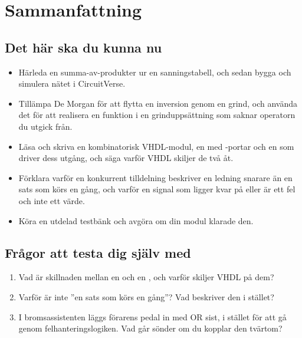 
\section{Sammanfattning}
\label{c1:sec:review}

\subsection*{Det här ska du kunna nu}
\begin{itemize}
  \item Härleda en summa-av-produkter ur en sanningstabell, och sedan bygga och simulera nätet i
    CircuitVerse.
  \item Tillämpa De Morgan för att flytta en inversion genom en grind, och använda det för att
    realisera en funktion i en grinduppsättning som saknar operatorn du utgick från.
  \item Läsa och skriva en kombinatorisk VHDL-modul, en  med
    -portar och en  som driver dess utgång, och säga varför
    VHDL skiljer de två åt.
  \item Förklara varför en konkurrent tilldelning beskriver en ledning snarare än en sats som körs
    en gång, och varför en signal som ligger kvar på  eller  är ett fel och
    inte ett värde.
  \item Köra en utdelad testbänk och avgöra om din modul klarade den.
\end{itemize}

\subsection*{Frågor att testa dig själv med}
\begin{enumerate}
  \item Vad är skillnaden mellan en  och en , och varför skiljer
    VHDL på dem?
  \item Varför är  inte ”en sats som körs en gång”? Vad beskriver den i
    stället?
  \item I bromsassistenten läggs förarens pedal in med OR sist, i stället för att gå genom
    felhanteringslogiken. Vad går sönder om du kopplar den tvärtom?
\end{enumerate}

